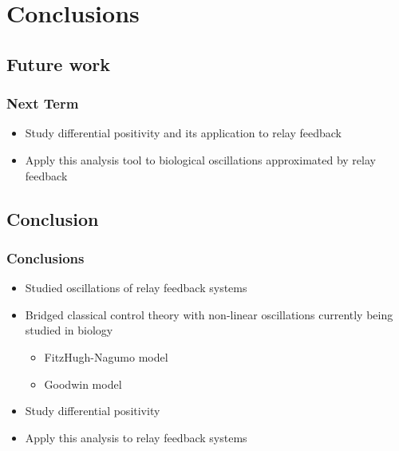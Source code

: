 \documentclass[11pt]{beamer}
\begin{document}
\section{Conclusions}
\subsection{Future work}
\begin{frame}
\frametitle{Next Term}
\begin{itemize}
\item Study differential positivity and its application to relay feedback
\item Apply this analysis tool to biological oscillations approximated by relay feedback 
\end{itemize}
\end{frame}

\subsection{Conclusion}
\begin{frame}
\frametitle{Conclusions}
	\begin{itemize}
	\item Studied oscillations of relay feedback systems
    \item Bridged classical control theory with non-linear oscillations currently being studied in biology
    \begin{itemize}
	\item FitzHugh-Nagumo model 
    \item Goodwin model
\end{itemize}
	\item Study differential positivity
	\item Apply this analysis to relay feedback systems
	\end{itemize}
\end{frame}
\end{document}

